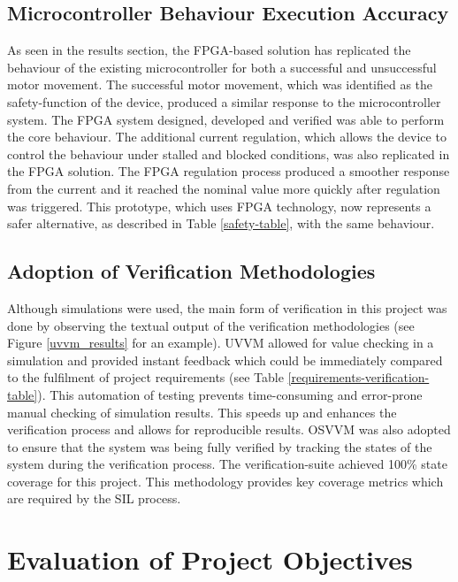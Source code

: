\subsection{Microcontroller Behaviour Execution Accuracy}

As seen in the results section, the FPGA-based solution has replicated the behaviour of the existing microcontroller for both a successful and unsuccessful motor movement. The successful motor movement, which was identified as the safety-function of the device, produced a similar response to the microcontroller system. The FPGA system designed, developed and verified was able to perform the core behaviour. The additional current regulation, which allows the device to control the behaviour under stalled and blocked conditions, was also replicated in the FPGA solution. The FPGA regulation process produced a smoother response from the current and it reached the nominal value more quickly after regulation was triggered. This prototype, which uses FPGA technology, now represents a safer alternative, as described in Table \ref{safety-table}, with the same behaviour.


\subsection{Adoption of Verification Methodologies}

Although simulations were used, the main form of verification in this project was done by observing the textual output of the verification methodologies (see Figure \ref{uvvm_results} for an example). UVVM allowed for value checking in a simulation and provided instant feedback which could be immediately compared to the fulfilment of project requirements (see Table \ref{requirements-verification-table}). This automation of testing prevents time-consuming and error-prone manual checking of simulation results. This speeds up and enhances the verification process and allows for reproducible results. OSVVM was also adopted to ensure that the system was being fully verified by tracking the states of the system during the verification process. The verification-suite achieved 100\% state coverage for this project. This methodology provides key coverage metrics which are required by the SIL process.



\section{Evaluation of Project Objectives}
\label{evaluation-of-objectives}


